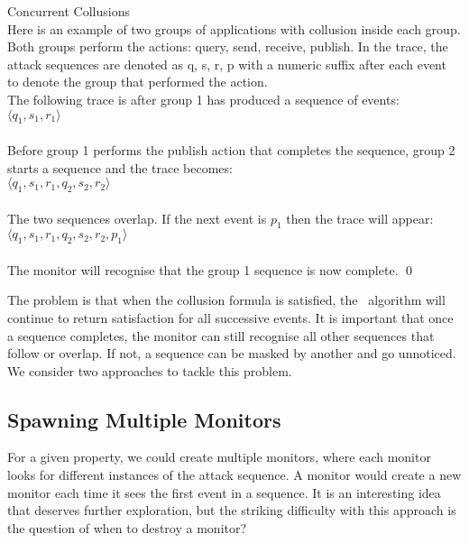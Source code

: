 \begin{myEx} Concurrent Collusions\\

\noindent Here is an example of two groups of applications with collusion inside each group.  Both groups perform the actions: query, send, receive, publish.  In the trace, the attack sequences are denoted as q, s, r, p with a numeric suffix after each event to denote the group that performed the action.\\

\noindent
The following trace is after group 1 has produced a sequence of events:\\
$\langle q_1, s_1, r_1 \rangle$\\
\\
\noindent
Before group 1 performs the publish action that completes the sequence, group 2 starts a sequence and the trace becomes:\\
$\langle q_1, s_1, r_1, q_2, s_2, r_2\rangle$\\
\\
\noindent
The two sequences overlap.  If the next event is $p_1$ then the trace will appear:\\
$\langle q_1, s_1, r_1, q_2, s_2, r_2, p_1 \rangle$\\
\\
\noindent
The monitor will recognise that the group 1 sequence is now complete.
\qed
\end{myEx}

The problem is that when the collusion formula is satisfied, the \RH\ algorithm will continue to return satisfaction for all successive events.  It is important that once a sequence completes, the monitor can still recognise all other sequences that follow or overlap.  If not, a sequence can be masked by another and go unnoticed.  We consider two approaches to tackle this problem.

\subsection{Spawning Multiple Monitors}

For a given property, we could create multiple monitors, where each monitor looks for different instances of the attack sequence.  A monitor would create a new monitor each time it sees the first event in a sequence.  It is an interesting idea that deserves further exploration, but the striking difficulty with this approach is the question of when to destroy a monitor?

